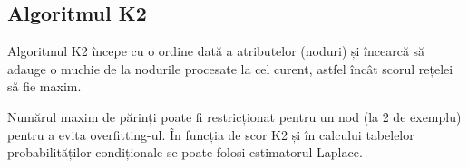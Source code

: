 \subsection{Algoritmul K2}

Algoritmul K2 începe cu o ordine dată a atributelor (noduri) și încearcă să adauge o muchie de la nodurile procesate la cel curent, astfel încât scorul rețelei să fie maxim.

Numărul maxim de părinți poate fi restricționat pentru un nod (la 2 de exemplu) pentru a evita overfitting-ul. În funcția de scor K2 și în calcului tabelelor probabilităților condiționale se poate folosi estimatorul Laplace. \cite{ruiz2005illustration}